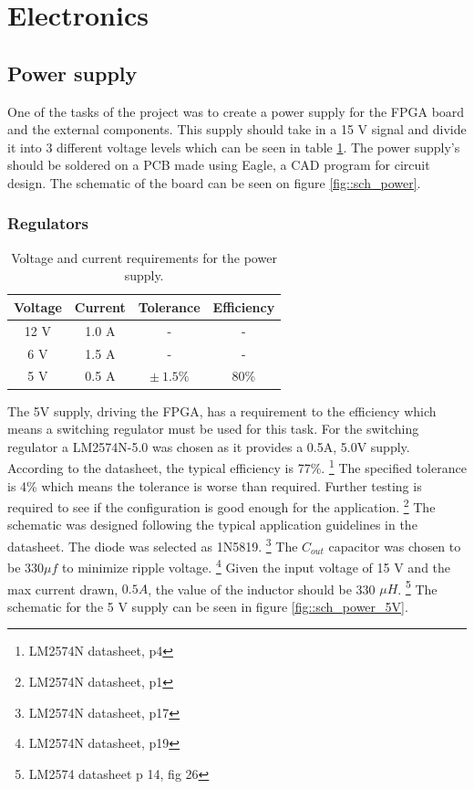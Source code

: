 \section{Electronics}
\subsection{Power supply}
One of the tasks of the project was to create a power supply for the FPGA board and the external components. This supply should take in a 15 V signal and divide it into 3 different voltage levels which can be seen in table \ref{tab::power_req}. The power supply's should be soldered on a PCB made using Eagle, a CAD program for circuit design. The schematic of the board can be seen on figure \ref{fig::sch_power}.
\subsubsection{Regulators}
\begin{table}
 \vspace{5 pt}
 \begin{tabular}{cccc}
  Voltage & Current & Tolerance      & Efficiency \\ \toprule
  12 V    & 1.0 A   & -              & -          \\
  6 V     & 1.5 A   & -              & -          \\
  5 V     & 0.5 A   & $\pm\ 1.5 \%$  & 80\%       \\
  \bottomrule
 \end{tabular}
\caption{Voltage and current requirements for the power supply.}
\label{tab::power_req}
 \vspace{5 pt}
\end{table}
The 5V supply, driving the FPGA, has a requirement to the efficiency which means a switching regulator must be used for this task. 
For the switching regulator a LM2574N-5.0 was chosen as it provides a 0.5A, 5.0V supply.
According to the datasheet, the typical efficiency is 77\%.
\footnote{LM2574N datasheet, p4}
The specified tolerance is 4\% which means the tolerance is worse than required. Further testing is required to see if the configuration is good enough for the application.
\footnote{LM2574N datasheet, p1}
The schematic was designed following the typical application guidelines in the datasheet.
The diode was selected as 1N5819. 
\footnote{LM2574N datasheet, p17}
The $C_{out}$ capacitor was chosen to be $330\mu f$ to minimize ripple voltage.
\footnote{LM2574N datasheet, p19}
Given the input voltage of 15 V and the max current drawn, $0.5 A$, the value of the inductor should be 330 $\mu H$. 
\footnote{LM2574 datasheet p 14, fig 26}
The schematic for the 5 V supply can be seen in figure \ref{fig::sch_power_5V}.

